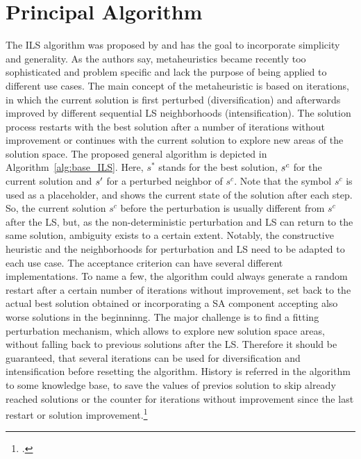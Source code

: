 \section{Principal Algorithm}
\label{sec:algorithm}
The \gls{ILS} algorithm was proposed by \cite{lourenco_iterated_2003} and has the goal to incorporate simplicity and generality.
As the authors say, metaheuristics became recently too sophisticated and problem specific and lack the purpose of
being applied to different use cases. The main concept of the metaheuristic is based on iterations, in which the current
solution is first perturbed (diversification) and afterwards improved by different sequential \gls{LS} neighborhoods
(intensification). The solution process restarts with the best solution after a number of iterations without improvement
or continues with the current solution to explore new areas of the solution space.
The proposed general algorithm is depicted in Algorithm~\ref{alg:base_ILS}. Here, $s^*$ stands for the best solution,
$s\sp{c}$ for the current solution and $s\sp{\prime}$ for a perturbed neighbor of $s^c$. Note that the symbol $s^c$
is used as a placeholder, and shows the current state of the solution after each step. So, the current solution
$s^c$ before the perturbation is usually different from $s^c$ after the \gls{LS}, but, as the non-deterministic
perturbation and \gls{LS} can return to the same solution, ambiguity exists to a certain extent.
Notably, the constructive heuristic and the neighborhoods for perturbation and \gls{LS} need to be adapted to
each use case. The acceptance criterion can have several different implementations. To name a few, the algorithm could always
generate a random restart after a certain number of iterations without improvement, set back to the actual best solution
obtained or incorporating a \gls{SA} component accepting also worse solutions in the beginninng. The major challenge is
to find a fitting perturbation mechanism, which allows to explore new solution space areas, without falling back to previous solutions
after the \gls{LS}. Therefore it should be guaranteed, that several iterations can be used for diversification and
intensification before resetting the algorithm. History is referred in the algorithm to some knowledge base,
to save the values of previos solution to skip already reached solutions or the counter for iterations without improvement since the
last restart or solution improvement.\footcite[cf.][]{lourenco_iterated_2003}


